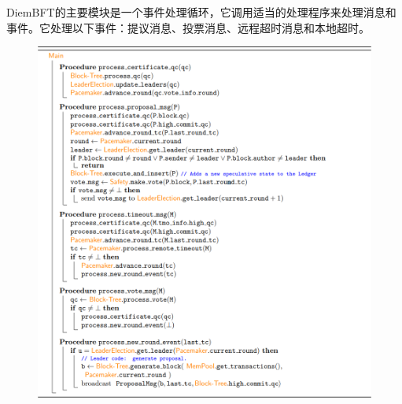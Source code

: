 DiemBFT的主要模块是一个事件处理循环，它调用适当的处理程序来处理消息和事件。它处理以下事件：提议消息、投票消息、远程超时消息和本地超时。

\begin{figure}[H]
    \centering
    \includegraphics[width=12cm]{figures/code1-1.png}
\end{figure}

  






